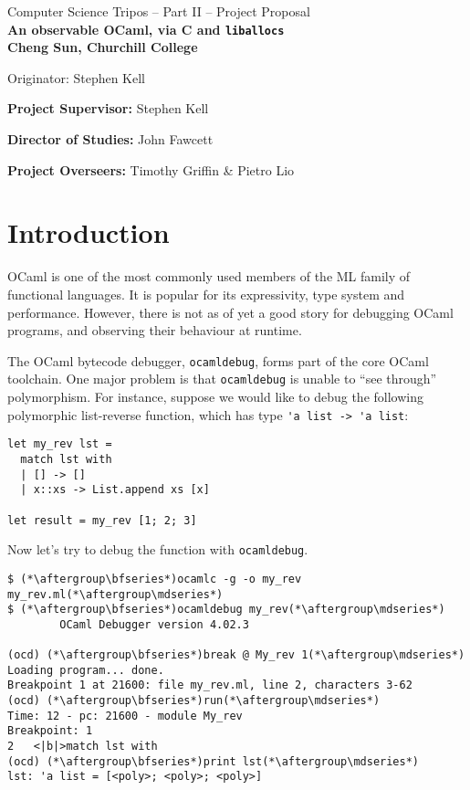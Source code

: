 \documentclass[12pt,twoside,a4paper]{article}
\begin{document}
\begin{center}
\Large Computer Science Tripos -- Part II -- Project Proposal
\\[4mm]
\LARGE \bfseries An observable OCaml, via C and \lstinline{liballocs} \mdseries
\\[4mm]

\large
Cheng Sun, Churchill College

Originator: Stephen Kell

\makeatletter
\@date
\makeatother

\end{center}

\vspace{5mm}

\textbf{Project Supervisor:} Stephen Kell

\textbf{Director of Studies:} John Fawcett

\textbf{Project Overseers:} Timothy Griffin \& Pietro Lio


\section*{Introduction}

OCaml is one of the most commonly used members of the ML family of functional languages. It is popular for its expressivity, type system and performance. However, there is not as of yet a good story for debugging OCaml programs, and observing their behaviour at runtime.

The OCaml bytecode debugger, \lstinline{ocamldebug}, forms part of the core OCaml toolchain. One major problem is that \lstinline{ocamldebug} is unable to ``see through'' polymorphism. For instance, suppose we would like to debug the following polymorphic list-reverse function, which has type \lstinline{'a list -> 'a list}:

\begin{lstlisting}
let my_rev lst =
  match lst with
  | [] -> []
  | x::xs -> List.append xs [x]

let result = my_rev [1; 2; 3]
\end{lstlisting}

Now let's try to debug the function with \lstinline{ocamldebug}.

\begin{lstlisting}
$ (*\aftergroup\bfseries*)ocamlc -g -o my_rev my_rev.ml(*\aftergroup\mdseries*)
$ (*\aftergroup\bfseries*)ocamldebug my_rev(*\aftergroup\mdseries*)
        OCaml Debugger version 4.02.3

(ocd) (*\aftergroup\bfseries*)break @ My_rev 1(*\aftergroup\mdseries*)
Loading program... done.
Breakpoint 1 at 21600: file my_rev.ml, line 2, characters 3-62
(ocd) (*\aftergroup\bfseries*)run(*\aftergroup\mdseries*)
Time: 12 - pc: 21600 - module My_rev
Breakpoint: 1
2   <|b|>match lst with
(ocd) (*\aftergroup\bfseries*)print lst(*\aftergroup\mdseries*)
lst: 'a list = [<poly>; <poly>; <poly>]
\end{lstlisting}
\end{document}
